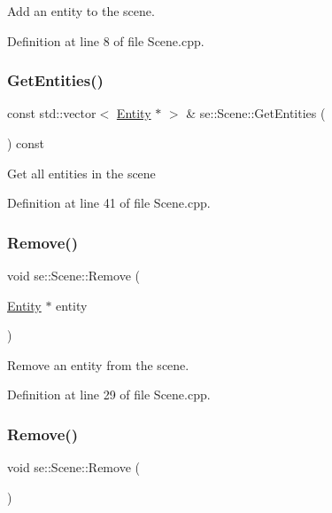 Add an entity to the scene. 

Definition at line 8 of file Scene.\+cpp.

\mbox{\label{classse_1_1_scene_a1367cf1066c13c94fde1236b5dd5b208}} 
\subsubsection{\texorpdfstring{Get\+Entities()}{GetEntities()}}
{\footnotesize\ttfamily const std\+::vector$<$ \mbox{\hyperlink{classse_1_1_entity}{Entity}} $\ast$ $>$ \& se\+::\+Scene\+::\+Get\+Entities (\begin{DoxyParamCaption}{ }\end{DoxyParamCaption}) const}

Get all entities in the scene 

Definition at line 41 of file Scene.\+cpp.

\mbox{\label{classse_1_1_scene_a4133b3e65c59229d8926dde7976ec004}} 
\subsubsection{\texorpdfstring{Remove()}{Remove()}\hspace{0.1cm}{\footnotesize\ttfamily [1/2]}}
{\footnotesize\ttfamily void se\+::\+Scene\+::\+Remove (\begin{DoxyParamCaption}\item[{\mbox{\hyperlink{classse_1_1_entity}{Entity}} $\ast$}]{entity }\end{DoxyParamCaption})}

Remove an entity from the scene. 

Definition at line 29 of file Scene.\+cpp.

\mbox{\label{classse_1_1_scene_a73f7789f2585e65174380be509b88435}} 
\subsubsection{\texorpdfstring{Remove()}{Remove()}\hspace{0.1cm}{\footnotesize\ttfamily [2/2]}}
{\footnotesize\ttfamily void se\+::\+Scene\+::\+Remove (\begin{DoxyParamCaption}{ }\end{DoxyParamCaption})}

